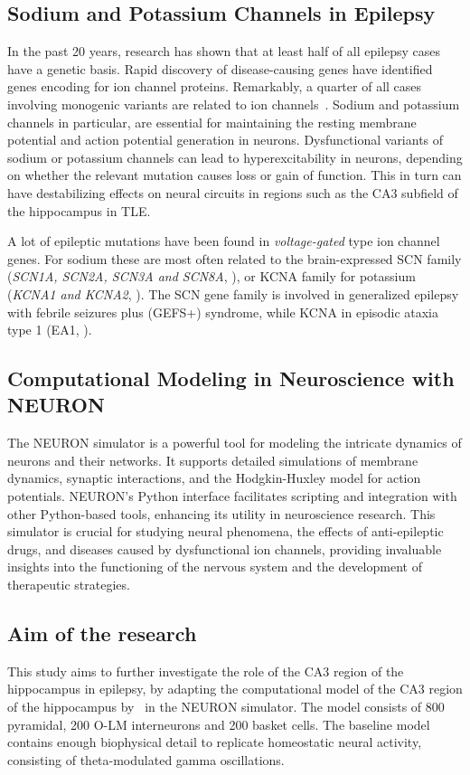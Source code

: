 \subsection{Sodium and Potassium Channels in Epilepsy}
In the past 20 years, research has shown that at least half of all epilepsy cases have a genetic basis.
Rapid discovery of disease-causing genes have identified genes encoding for ion channel proteins.
Remarkably, a quarter of all cases involving monogenic variants are related to ion channels~\parencite{strianoGeneticTestingPrecision2020,oyrerIonChannelsGenetic2018}.
Sodium and potassium channels in particular, are essential for maintaining the resting
membrane potential and action potential generation in neurons.
Dysfunctional variants of sodium or potassium channels can lead to hyperexcitability in neurons, depending on whether the relevant mutation causes loss or gain of function.
This in turn can have destabilizing effects on neural circuits in regions such as the CA3 subfield of the hippocampus in TLE\@.

A lot of epileptic mutations have been found in \textit{voltage-gated} type ion channel genes.
For sodium these are most often related to the brain-expressed SCN family (\textit{SCN1A, SCN2A, SCN3A and SCN8A}, \textcite{brunklausSodiumChannelEpilepsies2020}), 
or KCNA family for potassium  (\textit{KCNA1 and KCNA2}, \textcite{gaoPotassiumChannelsEpilepsy2022}).
The SCN gene family is involved in  generalized epilepsy with febrile seizures plus (GEFS+) syndrome, while KCNA in episodic ataxia type 1 (EA1, \textcite{gravesIonChannelsEpilepsy2006}).


\subsection{Computational Modeling in Neuroscience with NEURON}
The NEURON simulator is a powerful tool for modeling the intricate dynamics 
of neurons and their networks. It supports detailed simulations of membrane 
dynamics, synaptic interactions, and the Hodgkin-Huxley model for action 
potentials. NEURON's Python interface facilitates scripting and integration 
with other Python-based tools, enhancing its utility in neuroscience research.
This simulator is crucial for studying neural phenomena, the effects of 
anti-epileptic drugs, and diseases caused by dysfunctional ion channels, 
providing invaluable insights into the functioning of the nervous system 
and the development of therapeutic strategies.

\subsection{Aim of the research}
This study aims to further investigate the role of the CA3 region of the hippocampus in epilepsy, 
by adapting the computational model of the CA3 region of the hippocampus by~\textcite{neymotinKetamineDisruptsTheta2011} in the NEURON simulator.
The model consists of 800 pyramidal, 200 O-LM interneurons and 200 basket cells. 
The baseline model contains enough biophysical detail to replicate homeostatic neural activity, consisting of theta-modulated gamma oscillations.

